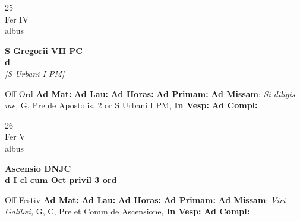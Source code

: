 \documentclass[10pt, openany]{book}
\begin{document}
    \begin{center}
        \begin{minipage}{3.5in}
            \vspace{2em}
            \begin{minipage}{0.5in}
                {\Huge 25} \\
                {\normalsize Fer IV} \\
                {\normalsize albus}
            \end{minipage}
            \begin{minipage}{3.0in}
                \textbf{ \large S Gregorii VII PC \\
                \textnormal{\normalsize d}} \\ \textit{[S Urbani I PM]} \\ 
            \end{minipage}
            \begin{justify}Off Ord
                \textbf{Ad Mat: }
                \textbf{Ad Lau: }
                \textbf{Ad Horas: }
                \textbf{Ad Primam: }\textbf{Ad Missam}: \textit{Si diligis me,} G, Pre de Apostolis, 2 or S Urbani I PM,  
                \textbf{In Vesp: }
                \textbf{Ad Compl: }
            \end{justify}
        \end{minipage}
    \end{center}

    \begin{center}
        \begin{minipage}{3.5in}
            \vspace{2em}
            \begin{minipage}{0.5in}
                {\Huge 26} \\
                {\normalsize Fer V} \\
                {\normalsize albus}
            \end{minipage}
            \begin{minipage}{3.0in}
                \textbf{ \large Ascensio DNJC \\
                \textnormal{\normalsize d I cl cum Oct privil 3 ord}} \\ 
            \end{minipage}
            \begin{justify}Off Festiv
                \textbf{Ad Mat: }
                \textbf{Ad Lau: }
                \textbf{Ad Horas: }
                \textbf{Ad Primam: }\textbf{Ad Missam}: \textit{Viri Galilæi,} G, C, Pre et Comm de Ascensione,  
                \textbf{In Vesp: }
                \textbf{Ad Compl: }
            \end{justify}
        \end{minipage}
    \end{center}
\end{document}

